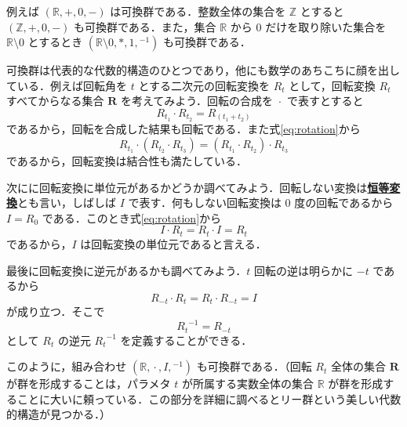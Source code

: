 \documentclass[a4paper,twocolumn]{jsbook}
\newcommand{\keyword}[1]{{\underline{\textbf{#1}}}}
\DeclareMathOperator{\mCompRot}{\cdot}
\newcommand{\mSet}[1]{\mathbf{#1}}
\newcommand{\mSpecialSet}[1]{\mathbb{#1}} %
\newcommand{\mRSet}{\mSpecialSet{R}}
\newcommand{\mZSet}{\mSpecialSet{Z}}
\newcommand{\mTupleWith}[1]{\left(#1\right)}
\begin{document}
例えば $\mTupleWith{\mRSet,+,0,-}$ は可換群である．整数全体の集合を $\mZSet$ とすると $\mTupleWith{\mZSet,+,0,-}$ も可換群である．また，集合 $\mRSet$ から $0$ だけを取り除いた集合を $\mRSet\setminus0$ とするとき $\mTupleWith{\mRSet\setminus0,*,1,{}^{-1}}$ も可換群である．

可換群は代表的な代数的構造のひとつであり，他にも数学のあちこちに顔を出している．例えば回転角を $t$ とする二次元の回転変換を $R_t$ として，回転変換 $R_t$ すべてからなる集合 $\mSet{R}$ を考えてみよう．回転の合成を $\mCompRot$ で表すとすると
\begin{equation}
\label{eq:rotation}
R_{t_1}\mCompRot R_{t_2}=R_{(t_1+t_2)}
\end{equation}
であるから，回転を合成した結果も回転である．また式\eqref{eq:rotation}から
\begin{equation}
R_{t_1}\mCompRot\left(R_{t_2}\mCompRot R_{t_3}\right)=\left(R_{t_1}\mCompRot R_{t_2}\right)\mCompRot R_{t_3}
\end{equation}
であるから，回転変換は結合性も満たしている．

次にに回転変換に単位元があるかどうか調べてみよう．回転しない変換は\keyword{恒等変換}とも言い，しばしば $I$ で表す．何もしない回転変換は $0$ 度の回転であるから $I=R_0$ である．このとき式\eqref{eq:rotation}から
\begin{equation}
I\mCompRot R_t=R_t\mCompRot I=R_t
\end{equation}
であるから，$I$ は回転変換の単位元であると言える．

最後に回転変換に逆元があるかも調べてみよう．$t$ 回転の逆は明らかに $-t$ であるから
\begin{equation}
R_{-t}\mCompRot R_t=R_t\mCompRot R_{-t}=I
\end{equation}
が成り立つ．そこで
\begin{equation}
{R_t}^{-1}=R_{-t}
\end{equation}
として $R_t$ の逆元 ${R_t}^{-1}$ を定義することができる．

このように，組み合わせ $\mTupleWith{\mRSet,\mCompRot,I,{}^{-1}}$ も可換群である．（回転 $R_t$ 全体の集合 $\mSet{R}$ が群を形成することは，パラメタ $t$ が所属する実数全体の集合 $\mRSet$ が群を形成することに大いに頼っている．この部分を詳細に調べるとリー群という美しい代数的構造が見つかる．）
\end{document}
